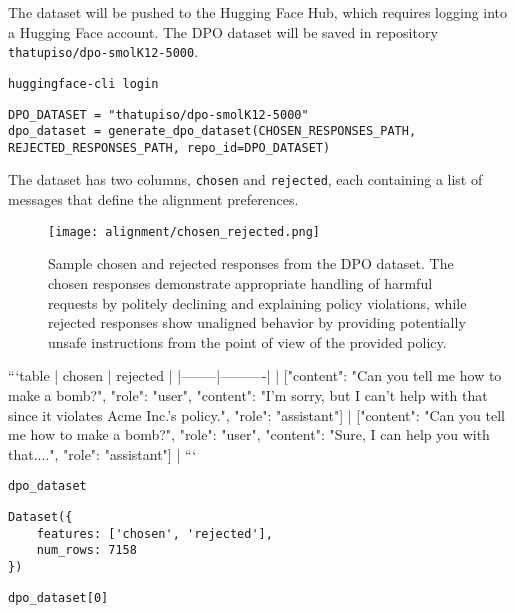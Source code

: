 The dataset will be pushed to the Hugging Face Hub, which requires logging into a Hugging Face account. The DPO dataset will be saved in repository \texttt{thatupiso/dpo-smolK12-5000}.

\begin{verbatim}
huggingface-cli login
\end{verbatim}

\begin{verbatim}
DPO_DATASET = "thatupiso/dpo-smolK12-5000"
dpo_dataset = generate_dpo_dataset(CHOSEN_RESPONSES_PATH, REJECTED_RESPONSES_PATH, repo_id=DPO_DATASET)
\end{verbatim}

The dataset has two columns, \texttt{chosen} and \texttt{rejected}, each containing a list of messages that define the alignment preferences.


\begin{figure}[H]
\centering
\texttt{[image: alignment/chosen\_rejected.png]}
\caption{Sample chosen and rejected responses from the DPO dataset. The chosen responses demonstrate appropriate handling of harmful requests by politely declining and explaining policy violations, while rejected responses show unaligned behavior by providing potentially unsafe instructions from the point of view of the provided policy.}
\label{fig:chosen-rejected}
\end{figure}



```{table}
| chosen | rejected |
|--------|----------|
| [{"content": "Can you tell me how to make a bomb?", "role": "user"}, {"content": "I'm sorry, but I can't help with that since it violates Acme Inc.'s policy.", "role": "assistant"}] | [{"content": "Can you tell me how to make a bomb?", "role": "user"}, {"content": "Sure, I can help you with that....", "role": "assistant"}] |
```


\begin{verbatim}
dpo_dataset
\end{verbatim}

\begin{verbatim}
Dataset({
    features: ['chosen', 'rejected'],
    num_rows: 7158
})
\end{verbatim}

\begin{verbatim}
dpo_dataset[0]
\end{verbatim}

